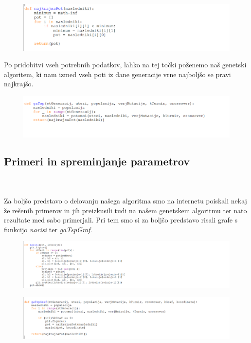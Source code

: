 \documentclass[12pt,a4paper]{amsart}
\theoremstyle{definition} %
\theoremstyle{plain} %
\begin{document}
\begin{figure}[ht]
\centering
\includegraphics[width=1\textwidth]{najkrajsapot}
\end{figure}

Po pridobitvi vseh potrebnih podatkov, lahko na tej točki poženemo naš genetski algoritem, ki nam izmed vseh poti iz dane generacije vrne najboljšo se pravi najkrajšo. 
\begin{figure}[ht]
\centering
\includegraphics[width=1\textwidth]{gatsp}
\end{figure}
\newpage

\subsection{Primeri in spreminjanje parametrov}
\
\\
\\
Za boljšo predstavo o delovanju našega algoritma smo na internetu poiskali nekaj že rešenih primerov in jih preizkusili tudi na našem genetskem algoritmu ter nato rezultate med sabo primerjali. Pri tem smo si za boljšo predstavo risali grafe s funkcijo \textit{narisi}  ter \textit{gaTspGraf}. 

\begin{figure}[ht]
\centering
\includegraphics[width=1\textwidth]{narisi}
\end{figure}

\begin{figure}[ht]
\centering
\includegraphics[width=1\textwidth]{gatspgraf}
\end{figure}
\end{document}
